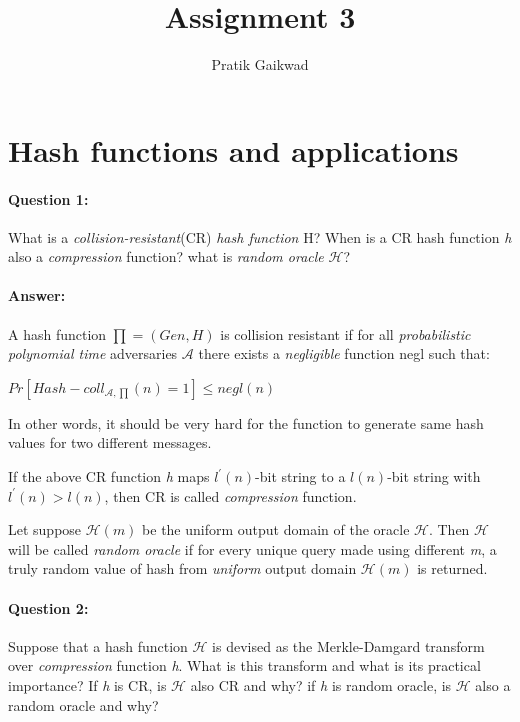 \documentclass{article}
\title{Assignment 3}
\author{Pratik Gaikwad}
\begin{document}
\maketitle

\section{Hash functions and applications}
    \paragraph{Question 1:} What is a \emph{collision-resistant}(CR) \emph{hash function} H? When is a CR hash function \emph{h} also a \emph{compression} function? what is \emph{random oracle} $\mathcal{H}$?
    
    \paragraph{Answer: \newline}
        A hash function $\prod = (Gen, H)$ is collision resistant if for all \emph{probabilistic polynomial time} adversaries $\mathcal{A}$ there exists a \emph{negligible} function negl such that:
        \begin{center}
            \begin{math}
                Pr[Hash-coll_{\mathcal{A},\prod}(n)=1] \leq negl(n)
            \end{math}            
        \end{center}
        
        In other words, it should be very hard for the function to generate same hash values for two different messages.
        
        If the above CR function \emph{h} maps $\mathit{l}^{\prime}(n)$-bit string to a $\mathit{l}(n)$-bit string with $\mathit{l}^{\prime}(n) > \mathit{l}(n)$, then CR is called \emph{compression} function.
        
        Let suppose $\mathcal{H}(m)$ be the uniform output domain of the oracle $\mathcal{H}$. Then $\mathcal{H}$ will be called \emph{random oracle} if for every unique query made using different \emph{m}, a truly random value of hash from \emph{uniform} output domain $\mathcal{H}(m)$ is returned.
        
    \paragraph{Question 2:} Suppose that a hash function $\mathcal{H}$ is devised as the Merkle-Damgard transform over \emph{compression} function \emph{h}. What is this transform and what is its practical importance? If \emph{h} is CR, is $\mathcal{H}$ also CR and why? if \emph{h} is random oracle, is $\mathcal{H}$ also a random oracle and why?
    
\end{document}
